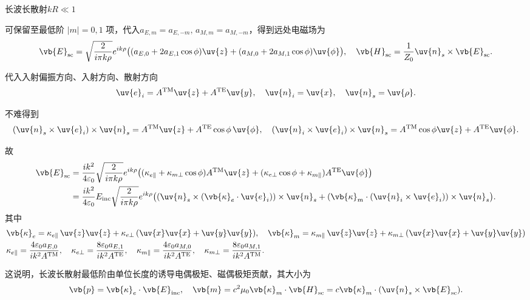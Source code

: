 \begin{exbox}
	长波长散射\(kR \ll 1\)

	可保留至最低阶 \(|m| = 0,1\) 项，代入\(a_{E,m}=a_{E,-m},\,a_{M,m}=a_{M,-m}\)，得到远处电磁场为
	\begin{align*}
		\vb{E}_{\rm sc} = \sqrt{\frac{2}{i\pi k\rho}}e^{ik\rho}\bigl((a_{E,0}+2a_{E,1}\cos\phi)\uv{z} + (a_{M,0}+2a_{M,1}\cos\phi)\uv{\phi}\bigr),\quad\vb{H}_{\rm sc} = \frac{1}{Z_0}\uv{n}_s\times\vb{E}_{\rm sc}.
	\end{align*}

	代入入射偏振方向、入射方向、散射方向
	\begin{align*}
		\uv{e}_i = A^{\rm TM}\uv{z} + A^{\rm TE}\uv{y},\quad\uv{n}_i = \uv{x},\quad\uv{n}_s = \uv{\rho}.
	\end{align*}

	不难得到
	\begin{align*}
		(\uv{n}_s\times\uv{e}_i)\times\uv{n}_s = A^{\rm TM}\uv{z} + A^{\rm TE}\cos\phi\,\uv{\phi},\quad
		(\uv{n}_i\times\uv{e}_i)\times\uv{n}_s = A^{\rm TM}\cos\phi\uv{z} + A^{\rm TE}\uv{\phi}.
	\end{align*}

	故
	\begin{align*}
		\vb{E}_{\rm sc} &= \frac{ik^2}{4\varepsilon_0}\sqrt{\frac{2}{i\pi k\rho}}e^{ik\rho}\bigl((\kappa_{e\parallel}+\kappa_{m\perp}\cos\phi)A^{\rm TM}\uv{z} + (\kappa_{e\perp}\cos\phi+\kappa_{m\parallel})A^{\rm TE}\uv{\phi}\bigr) \\&= \frac{ik^2}{4\varepsilon_0}E_{\rm inc}\sqrt{\frac{2}{i\pi k\rho}}e^{ik\rho}\bigl((\uv{n}_s\times(\vb{\kappa}_e\cdot\uv{e}_i))\times\uv{n}_s + (\vb{\kappa}_m\cdot(\uv{n}_i\times\uv{e}_i))\times\uv{n}_s\bigr).
	\end{align*}
	其中
	\begin{align*}
		&\vb{\kappa}_e = \kappa_{e\parallel}\,\uv{z}\uv{z} + \kappa_{e\perp}\,(\uv{x}\uv{x} + \uv{y}\uv{y}),\quad\vb{\kappa}_m = \kappa_{m\parallel}\,\uv{z}\uv{z} + \kappa_{m\perp}\,(\uv{x}\uv{x} + \uv{y}\uv{y})\\
		&\kappa_{e\parallel} = \frac{4\varepsilon_0a_{E,0}}{ik^2A^{\rm TM}},\quad\kappa_{e\perp} = \frac{8\varepsilon_0a_{E,1}}{ik^2A^{\rm TE}},\quad\kappa_{m\parallel} = \frac{4\varepsilon_0a_{M,0}}{ik^2A^{\rm TE}},\quad\kappa_{m\perp} = \frac{8\varepsilon_0a_{M,1}}{ik^2A^{\rm TM}}.
	\end{align*}

	这说明，长波长散射最低阶由单位长度的诱导电偶极矩、磁偶极矩贡献，其大小为
	\begin{align*}
		\vb{p} = \vb{\kappa}_e\cdot\vb{E}_{\rm inc},\quad
		\vb{m} = c^2\mu_0\vb{\kappa}_m\cdot\vb{H}_{\rm sc} = c\vb{\kappa}_m\cdot(\uv{n}_s\times\vb{E}_{\rm sc}).
	\end{align*}


\end{exbox}
